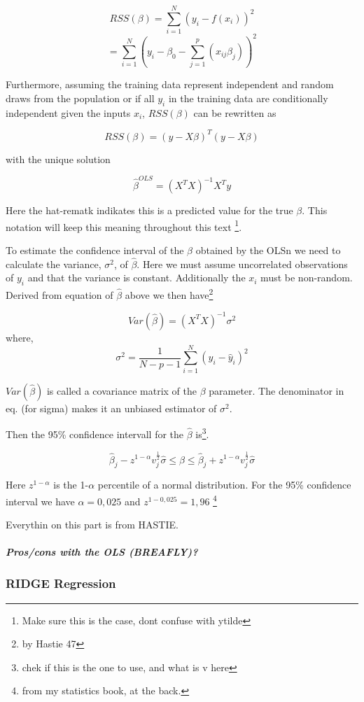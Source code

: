 \documentclass[12pt]{article}
\begin{document}
\begin{multicols}{2}
$$RSS(\beta)=\sum\limits_{i=1}^N(y_i-f(x_i))^2$$
		  $$=\sum\limits_{i=1}^N(y_i-\beta_0-\sum\limits_{j=1}^p(x_{ij}\beta_j))^2$$
		 
Furthermore, assuming the training data represent independent and random draws from the population or if all $y_i$ in the training data are conditionally independent given the inputs $x_i$, $RSS(\beta)$ can be rewritten as 

$$RSS(\beta)=(y-X\beta)^T(y-X\beta)$$

with the unique solution

$$\hat{\beta}^{OLS}=(X^TX)^{-1}X^Ty$$	

Here the hat-rematk indikates this is a predicted value for the true $\beta$. This notation will keep this meaning throughout this text \footnote{Make sure this is the case, dont confuse with ytilde}.

To estimate the confidence interval of the $\beta$ obtained by the OLSn we need to calculate the variance, $\sigma^2$, of $\hat{\beta}$. Here we must assume uncorrelated observations of $y_i$ and that the variance is constant. Additionally the $x_i$ must be non-random. Derived from equation of $\hat{\beta}$ above we then have\footnote{by Hastie 47}

$$Var(\hat{\beta})=(X^TX)^{-1}\sigma ^2 $$
where,
$$\sigma ^2 = \frac{1}{N-p-1} \sum\limits_{i=1}^N (y_i-\hat{y}_i)^2$$

$Var(\hat{\beta})$ is called a covariance matrix of the $\beta$ parameter. The denominator in eq. (for sigma) makes it an unbiased estimator of $\sigma^2$. 

Then the 95\% confidence intervall for the $\hat{\beta}$ is\footnote{chek if this is the one to use, and what is v here}. 

$$\hat{\beta}_j-z^{1-\alpha}v_j^\frac{1}{2}\hat{\sigma}\leq\hat{\beta}\leq\hat{\beta}_j+z^{1-\alpha}v_j^\frac{1}{2}\hat{\sigma}$$

Here $z^{1-\alpha}$ is the 1-$\alpha$ percentile of a normal distribution. For the 95\% confidence interval we have $\alpha =0,025$ and $z^{1-0,025}=1,96$ \footnote{from my statistics book, at the back.}

Everythin on this part is from HASTIE.

\subparagraph{Pros/cons with the OLS (BREAFLY)?}

\subsubsection{RIDGE Regression}


\end{multicols}
\end{document}
